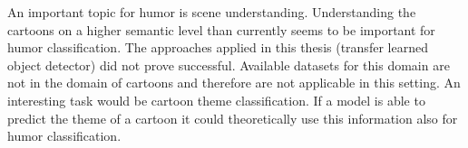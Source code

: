 \documentclass[draft,final,oneside]{vutinfth} %
\begin{document}
An important topic for humor is scene understanding. Understanding the cartoons on a higher semantic level than currently seems to be important for humor classification. The approaches applied in this thesis (transfer learned object detector) did not prove successful. Available datasets for this domain are not in the domain of cartoons and therefore are not applicable in this setting. An interesting task would be cartoon theme classification. If a model is able to predict the theme of a cartoon it could theoretically use this information also for humor classification.





\backmatter

\listoffigures %








\end{document}
